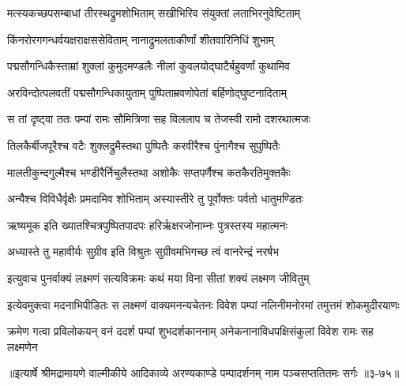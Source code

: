 \twolineshloka
{मत्स्यकच्छपसम्बाधां तीरस्थद्रुमशोभिताम्}
{सखीभिरिव संयुक्तां लताभिरनुवेष्टिताम्} %

\twolineshloka
{किंनरोरगगन्धर्वयक्षराक्षससेविताम्}
{नानाद्रुमलताकीर्णां शीतवारिनिधिं शुभाम्} %

\twolineshloka
{पद्मसौगन्धिकैस्ताम्रां शुक्लां कुमुदमण्डलैः}
{नीलां कुवलयोद्घाटैर्बहुवर्णां कुथामिव} %

\twolineshloka
{अरविन्दोत्पलवतीं पद्मसौगन्धिकायुताम्}
{पुष्पिताम्रवणोपेतां बर्हिणोद्घुष्टनादिताम्} %

\twolineshloka
{स तां दृष्ट्वा ततः पम्पां रामः सौमित्रिणा सह}
{विललाप च तेजस्वी रामो दशरथात्मजः} %

\twolineshloka
{तिलकैर्बीजपूरैश्च वटैः शुक्लद्रुमैस्तथा}
{पुष्पितैः करवीरैश्च पुंनागैश्च सुपुष्पितैः} %

\twolineshloka
{मालतीकुन्दगुल्मैश्च भण्डीरैर्निचुलैस्तथा}
{अशोकैः सप्तपर्णैश्च कतकैरतिमुक्तकैः} %

\twolineshloka
{अन्यैश्च विविधैर्वृक्षैः प्रमदामिव शोभिताम्}
{अस्यास्तीरे तु पूर्वोक्तः पर्वतो धातुमण्डितः} %

\twolineshloka
{ऋष्यमूक इति ख्यातश्चित्रपुष्पितपादपः}
{हरिर्ऋक्षरजोनाम्नः पुत्रस्तस्य महात्मनः} %

\twolineshloka
{अध्यास्ते तु महावीर्यः सुग्रीव इति विश्रुतः}
{सुग्रीवमभिगच्छ त्वं वानरेन्द्रं नरर्षभ} %

\twolineshloka
{इत्युवाच पुनर्वाक्यं लक्ष्मणं सत्यविक्रमः}
{कथं मया विना सीतां शक्यं लक्ष्मण जीवितुम्} %

\twolineshloka
{इत्येवमुक्त्वा मदनाभिपीडितः स लक्ष्मणं वाक्यमनन्यचेतनः}
{विवेश पम्पां नलिनीमनोरमां तमुत्तमं शोकमुदीरयाणः} %

\twolineshloka
{क्रमेण गत्वा प्रविलोकयन् वनं ददर्श पम्पां शुभदर्शकाननाम्}
{अनेकनानाविधपक्षिसंकुलां विवेश रामः सह लक्ष्मणेन} %


॥इत्यार्षे श्रीमद्रामायणे वाल्मीकीये आदिकाव्ये अरण्यकाण्डे पम्पादर्शनम् नाम पञ्चसप्ततितमः सर्गः ॥३-७५॥
